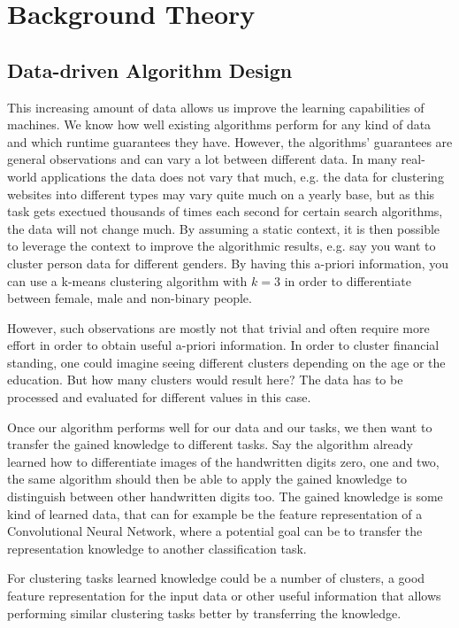 \chapter{Background Theory}
\label{chapter:background}

\section{Data-driven Algorithm Design}

This increasing amount of data allows us improve the learning capabilities of machines. We know how well existing algorithms perform for any kind of data and which runtime guarantees they have. However, the algorithms' guarantees are general observations and can vary a lot between different data. In many real-world applications the data does not vary that much, e.g. the data for clustering websites into different types may vary quite much on a yearly base, but as this task gets exectued thousands of times each second for certain search algorithms, the data will not change much. By assuming a static context, it is then possible to leverage the context to improve the algorithmic results, e.g. say you want to cluster person data for different genders. By having this a-priori information, you can use a k-means clustering algorithm with $k = 3$ in order to differentiate between female, male and non-binary people.

However, such observations are mostly not that trivial and often require more effort in order to obtain useful a-priori information. In order to cluster financial standing, one could imagine seeing different clusters depending on the age or the education. But how many clusters would result here? The data has to be processed and evaluated for different values in this case.

Once our algorithm performs well for our data and our tasks, we then want to transfer the gained knowledge to different tasks. Say the algorithm already learned how to differentiate images of the handwritten digits zero, one and two, the same algorithm should then be able to apply the gained knowledge to distinguish between other handwritten digits too. The gained knowledge is some kind of learned data, that can for example be the feature representation of a Convolutional Neural Network, where a potential goal can be to transfer the representation knowledge to another classification task.

For clustering tasks learned knowledge could be a number of clusters, a good feature representation for the input data or other useful information that allows performing similar clustering tasks better by transferring the knowledge.

